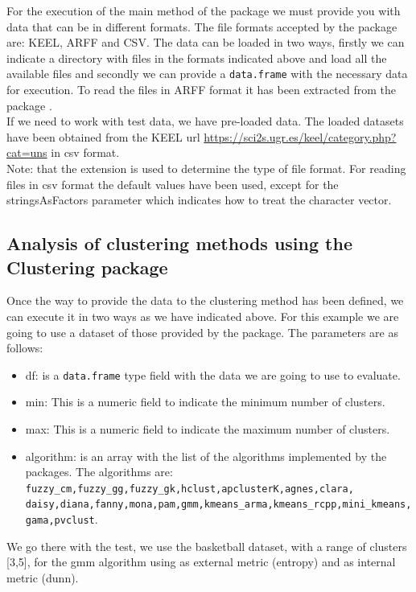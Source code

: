 For the execution of the main method of the package we must provide you with data that can be in different formats. The file formats accepted by the package are: KEEL, ARFF and CSV. The data can be loaded in two ways, firstly we can indicate a directory with files in the formats indicated above and load all the available files and secondly we can provide a \texttt{data.frame} with the necessary data for execution. To read the files in ARFF format it has been extracted from the  package \cite{b55}.\\
If we need to work with test data, we have pre-loaded data. The loaded datasets have been obtained from the KEEL url \url{https://sci2s.ugr.es/keel/category.php?cat=uns} in csv format.\\
Note: that the extension is used to determine the type of file format. For reading files in csv format the default values have been used, except for the stringsAsFactors parameter which indicates how to treat the character vector.

\subsection*{Analysis of clustering methods using the Clustering package}

Once the way to provide the data to the clustering method has been defined, we can execute it in two ways as we have indicated above. For this example we are going to use a dataset of those provided by the package. The parameters are as follows:
\begin{itemize}
  \item df: is a \texttt{data.frame} type field with the data we are going to use to evaluate.
  \item min: This is a numeric field to indicate the minimum number of clusters.
  \item max: This is a numeric field to indicate the maximum number of clusters.
  \item algorithm: is an array with the list of the algorithms implemented by the packages. The algorithms are: \texttt{fuzzy\_cm,fuzzy\_gg,fuzzy\_gk,hclust,apclusterK,agnes,clara,\\daisy,diana,fanny,mona,pam,gmm,kmeans\_arma,kmeans\_rcpp,mini\_kmeans,gama,pvclust}.
\end{itemize}

We go there with the test, we use the basketball dataset, with a range of clusters [3,5], for the gmm algorithm using as external metric (entropy) and as internal metric (dunn).

